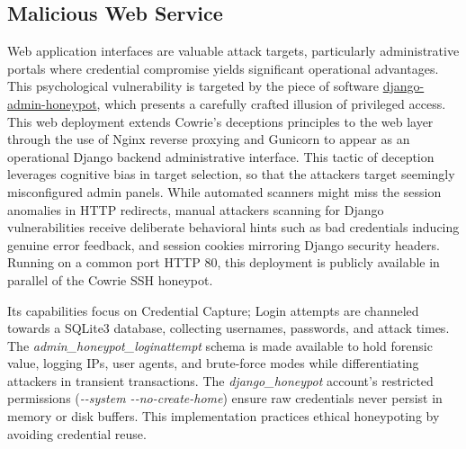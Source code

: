\documentclass{cls/ULBreport}
\begin{document}
    \subsection{Malicious Web Service}
    
Web application interfaces are valuable attack targets, particularly administrative portals where credential compromise yields significant operational advantages. This psychological vulnerability is targeted by the piece of software \href{https://github.com/dmpayton/django-admin-honeypot}{django-admin-honeypot}, which presents a carefully crafted illusion of privileged access. This web deployment extends Cowrie's deceptions principles to the web layer through the use of Nginx reverse proxying and Gunicorn to appear as an operational Django backend administrative interface. This tactic of deception leverages cognitive bias in target selection, so that the attackers target seemingly misconfigured admin panels. While automated scanners might miss the session anomalies in HTTP redirects, manual attackers scanning for Django vulnerabilities receive deliberate behavioral hints such as bad credentials inducing genuine error feedback, and session cookies mirroring Django security headers. Running on a common port HTTP 80, this deployment is publicly available in parallel of the Cowrie SSH honeypot. 

Its capabilities focus on Credential Capture; Login attempts are channeled towards a
SQLite3 database, collecting usernames, passwords, and attack times. The \textit{admin\_honeypot\_loginattempt} schema is made available to hold forensic
value, logging IPs, user agents, and brute-force modes while differentiating attackers in transient transactions. The \textit{django\_honeypot} account's restricted permissions (\textit{-{-}system -{-}no-create-home}) ensure raw credentials never persist in memory or disk buffers. This implementation practices ethical honeypoting by avoiding credential reuse.
    
\end{document}
